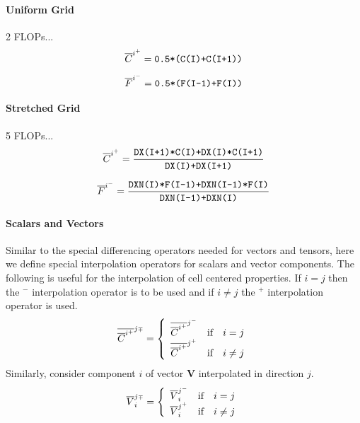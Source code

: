 \documentclass[11pt]{article}
\begin{document}
\paragraph{Uniform Grid} 2 FLOPs...
\begin{equation}
\label{eqn_linear_interpolation}
\overline{C}^{i^+} = \mbox{\tt 0.5*(C(I)+C(I+1))}
\end{equation}

\begin{equation}
\label{eqn_linear_interpolation}
\overline{F}^{i^-} = \mbox{\tt 0.5*(F(I-1)+F(I))}
\end{equation}

\paragraph{Stretched Grid} 5 FLOPs...
\begin{equation}
\label{eqn_lever_rule}
\overline{C}^{i^+} = \frac{\mbox{\tt DX(I+1)*C(I)+DX(I)*C(I+1)}}{\mbox{\tt DX(I)+DX(I+1)}}
\end{equation}

\begin{equation}
\label{eqn_lever_rule}
\overline{F}^{i^-} = \frac{\mbox{\tt DXN(I)*F(I-1)+DXN(I-1)*F(I)}}{\mbox{\tt DXN(I-1)+DXN(I)}}
\end{equation}

\paragraph{Scalars and Vectors} Similar to the special differencing operators needed for vectors and tensors, here we define special interpolation operators for scalars and vector components. The following is useful for the interpolation of cell centered properties. If $i=j$ then the $^-$ interpolation operator is to be used and if $i\ne j$ the $^+$ interpolation operator is used.
\begin{equation}
\overline{\overline{C}^{i^{\scriptscriptstyle +}}}^{j{\scriptscriptstyle \mp}} = \left\{ \begin{array}{ll} \overline{\overline{C}^{i^{\scriptscriptstyle +}}}^{j^-} & \mbox{if} \quad i=j \\ \overline{\overline{C}^{i^{\scriptscriptstyle +}}}^{j^+} & \mbox{if} \quad i\ne j \end{array} \right.
\end{equation}
Similarly, consider component $i$ of vector $\mathbf{V}$ interpolated in direction $j$.
\begin{equation}
\overline{V}_i^{j{\scriptscriptstyle \mp}} = \left\{ \begin{array}{ll} \overline{V}_i^{j^{\scriptscriptstyle -}} & \mbox{if} \quad i=j \\ \overline{V}_i^{j^{\scriptscriptstyle +}} & \mbox{if} \quad i\ne j \end{array} \right.
\end{equation}
\end{document}
